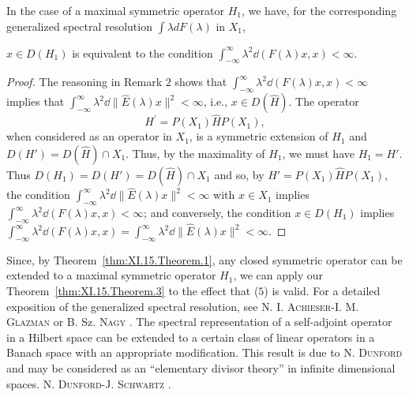\begin{theorem}\label{thm:XI.15.Theorem.3} In the case of a maximal symmetric operator $H_{1}$, we have, for the corresponding generalized spectral resolution $\int \lambda dF(\lambda)$ in $X_{1}$, 

$x \in D(H_1)$ is equivalent to the condition $\int_{-\infty}^{\infty} \lambda^2 \dd(F(\lambda)x, x) < \infty$. 
\end{theorem}


\begin{proof}
 The reasoning in Remark $2$ shows that $\int_{-\infty}^{\infty} \lambda^2 \dd(F(\lambda)x, x) < \infty$ implies that $\int_{-\infty}^{\infty} \lambda^2 \dd\|\hat{E}(\lambda)x\|^2 < \infty$, i.e., $x \in D(\hat{H})$. The operator 
\[
H ^{\prime} = P (X _{1}) \hat {H} P (X _{1}),
\]
when considered as an operator in $X_{1}$, is a symmetric extension of $H_{1}$ and $D(H') = D(\hat{H}) \cap X_{1}$. Thus, by the maximality of $H_{1}$, we must have $H_{1} = H'$. Thus $D(H_{1}) = D(H') = D(\hat{H}) \cap X_{1}$ and so, by $H' = P(X_{1})\hat{H}P(X_{1})$, the condition $\int_{-\infty}^{\infty}\lambda^{2}\dd\|\hat{E}(\lambda)x\|^{2} < \infty$ with $x \in X_{1}$ implies 
$\int_{-\infty}^{\infty}\lambda^{2}\dd(F(\lambda)x,x) < \infty$; and conversely, the condition $x\in D(H_1)$ implies $\int_{-\infty}^{\infty}\lambda^{2}\dd(F(\lambda)x,x) = \int_{-\infty}^{\infty}\lambda^{2}\dd\|\hat{E} (\lambda)x\|^{2} < \infty .$ 
\end{proof}

\begin{remarkn}[Remark $3$] Since, by Theorem~\ref{thm:XI.15.Theorem.1}, any closed symmetric operator can be extended to a maximal symmetric operator $H_{1}$, we can apply our Theorem~\ref{thm:XI.15.Theorem.3} to the effect that ($5$) is valid. For a detailed exposition of the generalized spectral resolution, see N. I. \textsc{Achieser}-I. M. \textsc{Glazman} \cite{achieser1} or B. Sz. \textsc{Nagy} \cite{nagy219}. The spectral representation of a self-adjoint operator in a Hilbert space can be extended to a certain class of linear operators in a Banach space with an appropriate modification. This result is due to N. \textsc{Dunford} and may be considered as an ``elementary divisor theory'' in infinite dimensional spaces. N. \textsc{Dunford}-J. \textsc{Schwartz} \cite{dunford49}. 
\end{remarkn}


\label{sec:XI.16}

